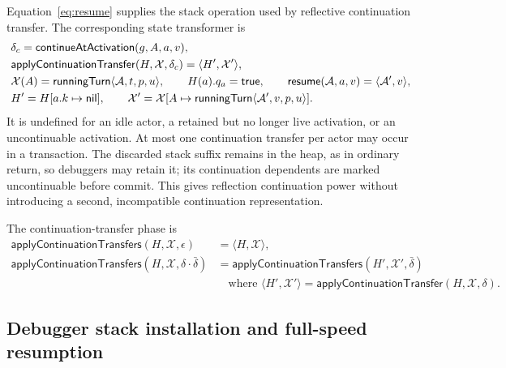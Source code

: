 Equation~\eqref{eq:resume} supplies the stack operation used by reflective
continuation transfer.  The corresponding state transformer is
\begin{equation}\label{eq:reflective-continuation-transfer}
\begin{aligned}
 &\delta_c=\mathsf{continueAtActivation}(g,A,a,v),\\
 &\mathsf{applyContinuationTransfer}(H,\mathcal X,\delta_c)
      =\langle H',\mathcal X'\rangle,\\
 &\mathcal X(A)=\mathsf{runningTurn}\langle\mathcal A,t,p,u\rangle,\qquad
 H(a).q_a=\mathsf{true},\qquad
 \mathsf{resume}(\mathcal A,a,v)=\langle\mathcal A',v\rangle,\\
 &H'=H[a.k\mapsto\mathsf{nil}],\qquad
 \mathcal X'=\mathcal X[A\mapsto
       \mathsf{runningTurn}\langle\mathcal A',v,p,u\rangle].
\end{aligned}
\end{equation}
It is undefined for an idle actor, a retained but no longer live activation,
or an uncontinuable activation.  At most one continuation transfer per actor
may occur in a transaction.  The discarded stack suffix remains in the heap,
as in ordinary return, so debuggers may retain it; its continuation dependents
are marked uncontinuable before commit.  This gives reflection continuation
power without introducing a second, incompatible continuation representation.

The continuation-transfer phase is
\begin{equation}\label{eq:continuation-command-fold}
\begin{aligned}
 \mathsf{applyContinuationTransfers}(H,\mathcal X,\epsilon)
   &=\langle H,\mathcal X\rangle,\\
 \mathsf{applyContinuationTransfers}
      (H,\mathcal X,\delta\cdot\bar\delta)
   &=\mathsf{applyContinuationTransfers}(H',\mathcal X',\bar\delta)\\
 &\quad\text{where }\langle H',\mathcal X'\rangle=
       \mathsf{applyContinuationTransfer}(H,\mathcal X,\delta).
\end{aligned}
\end{equation}

\subsection{Debugger stack installation and full-speed resumption}

